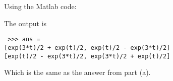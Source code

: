 Using the Matlab code:


The output is 

\texttt{
    >>> ans = \\
    \hspace*{2em} [exp(3*t)/2 + exp(t)/2, exp(t)/2 - exp(3*t)/2] \\
    \hspace*{2em} [exp(t)/2 - exp(3*t)/2, exp(3*t)/2 + exp(t)/2]
}

Which is the same as the answer from part (a).